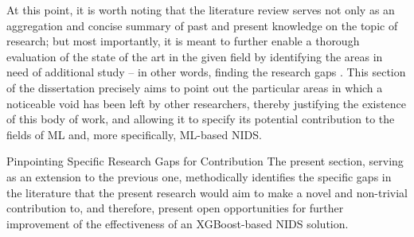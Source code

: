 At this point, it is worth noting that the literature review serves not only as an aggregation and concise summary of past and present knowledge on the topic of research; but most importantly, it is meant to further enable a thorough evaluation of the state of the art in the given field by identifying the areas in need of additional study – in other words, finding the research gaps \parencite{mahfouz2022systematic}. This section of the dissertation precisely aims to point out the particular areas in which a noticeable void has been left by other researchers, thereby justifying the existence of this body of work, and allowing it to specify its potential contribution to the fields of ML and, more specifically, ML-based NIDS.

Pinpointing Specific Research Gaps for Contribution 
The present section, serving as an extension to the previous one, methodically identifies the specific gaps in the literature that the present research would aim to make a novel and non-trivial contribution to, and therefore, present open opportunities for further improvement of the effectiveness of an XGBoost-based NIDS solution.

